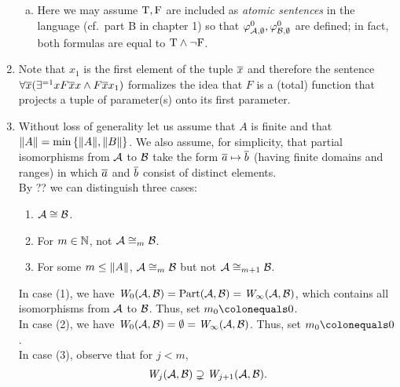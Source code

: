 \begin{enumerate}[1.]
\begin{enumerate}[(a)]
\item Here we may assume $\mathrm{T}, \mathrm{F}$ are included as \emph{atomic sentences} in the language (cf.\ part B in chapter 1) so that $\varphi^{0}_{\mathcal{A}, \emptyset}, \varphi^{0}_{\mathcal{B}, \emptyset}$ are defined; in fact, both formulas are equal to $\mathrm{T} \land \neg\mathrm{F}$.
\end{enumerate}
%
\item {} Note that $x_1$ is the first element of the tuple $\overline{x}$ and therefore the sentence $\forall \overline{x} (\exists^{= 1}x F\overline{x}x \land F\overline{x}x_1)$ formalizes the idea that $F$ is a (total) function that projects a tuple of parameter(s) onto its first parameter.
%
\item {} Without loss of generality let us assume that $A$ is finite and that $\|A\| = \min{\{\|A\|, \|B\|\}}$. We also assume, for simplicity, that partial isomorphisms from $\mathcal{A}$ to $\mathcal{B}$ take the form $\overline{a} \mapsto \overline{b}$ (having finite domains and ranges) in which $\overline{a}$ and $\overline{b}$ consist of distinct elements.
\medskip\\
By ?? we can distinguish three cases:
\begin{enumerate}[(1)]
\item $\strct{A} \isom \strct{B}$.
\item For $m \in \mathbb{N}$, not $\strct{A} \isom_m \strct{B}$.
\item For some $m \leq \|A\|$, $\strct{A} \isom_m \strct{B}$ but not $\strct{A} \isom_{m + 1} \strct{B}$.
\end{enumerate}
In case (1), we have $\winpos{0}(\strct{A}, \strct{B}) = \partisoms(\strct{A}, \strct{B}) = \winpos{\infty}(\strct{A}, \strct{B})$, which contains all isomorphisms from $\mathcal{A}$ to $\mathcal{B}$. Thus, set $m_0 \defas 0$.
\medskip\\
In case (2), we have $\winpos{0}(\strct{A}, \strct{B}) = \emptyset = \winpos{\infty}(\strct{A}, \strct{B})$. Thus, set $m_0 \defas 0$.
\medskip\\
In case (3), observe that for $j < m$,
\[
\winpos{j}(\strct{A}, \strct{B}) \supsetneq \winpos{j + 1}(\strct{A}, \strct{B}).
\]

\end{enumerate}
